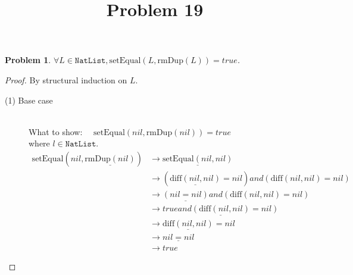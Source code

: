 \documentclass[12pt, a4paper]{article}
\title{Problem 19}
\date{\vspace{-5ex}}
\newtheorem{problem}{Problem}
\newcommand{\rel}[1]{\mathrel{#1}}
\newcommand{\rmx}[1]{\mathrm{#1}}
\newcommand{\larrow}{\longrightarrow}
\newcommand{\under}{\underline}
\begin{document}
\maketitle

\begin{problem}
$\forall L \in \mathtt{NatList}, \rmx{setEqual}(L, \rmx{rmDup}(L)) = true$.
\end{problem}
\begin{proof}
By structural induction on $L$.
\begin{description}
\item[(1) Base case]~\\
\noindent
What to show: $\quad \rmx{setEqual}(nil, \rmx{rmDup}(nil)) = true$\\
where $l \in \mathtt{NatList}$.
\begin{align*}
\rmx{setEqual}(nil, \under{\rmx{rmDup}(nil)})
	&\larrow \under{\rmx{setEqual}(nil, nil)} \tag{by rmDup1} \\
	&\larrow (\under{\rmx{diff}(nil, nil)} = nil) \rel{and} (\rmx{diff}(nil, nil) = nil) \tag{by setEq} \\
	&\larrow \under{(nil = nil)} \rel{and} (\rmx{diff}(nil, nil) = nil) \tag{by diff1} \\
	&\larrow \under{true \rel{and} (\rmx{diff}(nil, nil) = nil)} \tag{by equality} \\
	&\larrow \under{\rmx{diff}(nil, nil)} = nil \tag{by and} \\
	&\larrow \under{nil = nil} \tag{by diff1} \\
	&\larrow true \tag{by equality}
\end{align*}


\end{description}
\end{proof}
\end{document}
